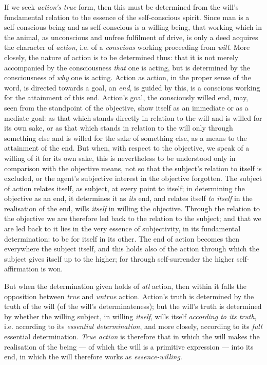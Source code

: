 \documentclass[12pt,a4paper]{book}
\begin{document}
If we seek \emph{action's true} form, then this must be determined from the
will's fundamental relation to the essence of the self-conscious spirit. Since
man is a self-conscious being and as self-conscious is a willing being, that
working which in the animal, as unconscious and unfree fulfilment of drive, is
only a
deed acquires the character of \emph{action}, i.e. of a \emph{conscious}
working proceeding from \emph{will}. More closely, the nature of action is to be
determined thus: that it is not merely accompanied by the consciousness
\emph{that} one is acting, but is determined by the consciousness of
\emph{why} one is acting. Action as action, in the proper sense of the word,
is directed towards a goal, an \emph{end}, is guided by this, is a conscious
working for the attainment of this end. Action's goal, the consciously willed
end, may, seen from the standpoint of the objective, show itself as an
immediate or as a mediate goal: as that which stands directly in relation to
the will and is willed for its own sake, or as that which stands in relation
to the will only through something else and is willed for the sake of
something else, as a means to the attainment of the end. But when, with
respect to the objective, we speak of a willing of it for its own sake, this
is nevertheless to be understood only in comparison with the objective means,
not so that the subject's relation to itself is excluded, or the agent's
subjective interest in the objective forgotten. The subject of action relates
itself, as subject, at every point to itself; in determining the objective as
an end, it determines it as \emph{its} end, and relates itself \emph{to
itself} in the realisation of the end, wills \emph{itself} in willing the
objective. Through the relation to the objective we are therefore led back to
the relation to the subject; and that we are led back to it lies in the very
essence of subjectivity, in its fundamental determination: to be for itself in
its other. The end of action becomes then everywhere the subject itself, and
this holds also of the action through which the subject gives itself up to the
higher; for through self-surrender the higher self-affirmation is won.

But when the determination given holds of \emph{all} action, then within it
falls the opposition between \emph{true} and \emph{untrue} action.
Action's truth is determined by the truth of the will (of the will's
determinateness); but the will's truth is determined by whether the willing
subject, in willing \emph{itself}, wills itself \emph{according to its truth},
i.e. according to its \emph{essential determination}, and more closely,
according to its \emph{full} essential determination. \emph{True action} is
therefore that in which the will makes the realisation of the being --- of
which the will is a primitive expression --- into its end, in which the will
therefore works as \emph{essence-willing}.
\end{document}
